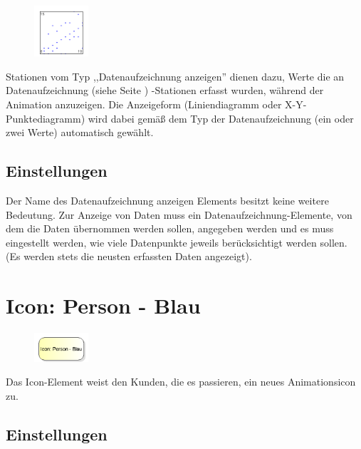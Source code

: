\begin{figure}
\vspace{-22pt}
\includegraphics[width=2cm]{imageModelElementAnimationRecord.png}
\vspace{-22pt}
\end{figure}

Stationen vom Typ ,,Datenaufzeichnung anzeigen'' dienen dazu, Werte die an
Datenaufzeichnung (siehe Seite \pageref{ref:ModelElementRecord}) -Stationen erfasst
wurden, während der Animation anzuzeigen. Die Anzeigeform (Liniendiagramm oder
X-Y-Punktediagramm) wird dabei gemäß dem Typ der Datenaufzeichnung (ein oder zwei Werte)
automatisch gewählt.

\subsection*{Einstellungen}

Der Name des Datenaufzeichnung anzeigen Elements besitzt keine weitere Bedeutung.
Zur Anzeige von Daten muss ein Datenaufzeichnung-Elemente, von dem die Daten
übernommen werden sollen, angegeben werden und es muss eingestellt werden, wie
viele Datenpunkte jeweils berücksichtigt werden sollen. (Es werden stets die neusten
erfassten Daten angezeigt).


\section{Icon: Person - Blau}
\label{ref:ModelElementClientIcon}

\begin{figure}
\vspace{-22pt}
\includegraphics[width=2cm]{imageModelElementClientIcon.png}
\vspace{-22pt}
\end{figure}

Das Icon-Element weist den Kunden, die es passieren, ein neues Animationsicon zu.

\subsection*{Einstellungen}

